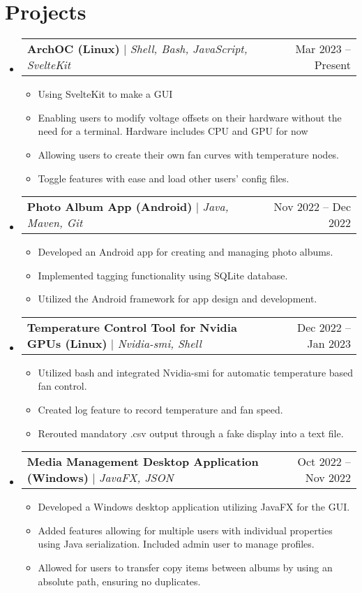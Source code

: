 \documentclass[letterpaper,12pt]{article}
\makeatletter
\newcommand{\resumeItem}[1]{
  \item\small{
    {#1 \vspace{-2pt}}
  }
}
\newcommand{\resumeProjectHeading}[2]{
    \item
    \begin{tabular*}{0.97\textwidth}{l@{\extracolsep{\fill}}r}
      \small#1 & #2 \\
    \end{tabular*}\vspace{-7pt}
}
\newcommand{\resumeSubHeadingListStart}{\begin{itemize}[leftmargin=0.15in, label={}]}
\newcommand{\resumeSubHeadingListEnd}{\end{itemize}}
\newcommand{\resumeItemListStart}{\begin{itemize}}
\newcommand{\resumeItemListEnd}{\end{itemize}\vspace{-5pt}}
\makeatother
\begin{document}
\section{Projects}
    \resumeSubHeadingListStart
      \resumeProjectHeading
          {\textbf{ArchOC (Linux)} $|$ \emph{Shell, Bash, JavaScript, SvelteKit}}{Mar 2023 -- Present}
          \resumeItemListStart
            \resumeItem{Using SvelteKit to make a GUI}
            \resumeItem{Enabling users to modify voltage offsets on their hardware without the need for a terminal. Hardware includes CPU and GPU for now}
            \resumeItem{Allowing users to create their own fan curves with temperature nodes.}
            \resumeItem{Toggle features with ease and load other users’ config files.}
          \resumeItemListEnd
      \resumeProjectHeading
          {\textbf{Photo Album App (Android)} $|$ \emph{Java, Maven, Git}}{Nov 2022 -- Dec 2022}
          \resumeItemListStart
            \resumeItem{Developed an Android app for creating and managing photo albums.}
            \resumeItem{Implemented tagging functionality using SQLite database.}
            \resumeItem{Utilized the Android framework for app design and development.}
          \resumeItemListEnd
     \resumeProjectHeading
          {\textbf{Temperature Control Tool for Nvidia GPUs (Linux)} $|$ \emph{Nvidia-smi, Shell}}{Dec 2022 -- Jan 2023}
          \resumeItemListStart
            \resumeItem{Utilized bash and integrated Nvidia-smi for automatic temperature based fan control.}
            \resumeItem{Created log feature to record temperature and fan speed.}
            \resumeItem{Rerouted mandatory .csv output through a fake display into a text file.}
          \resumeItemListEnd
    \resumeProjectHeading
          {\textbf{Media Management Desktop Application (Windows)} $|$ \emph{JavaFX, JSON}}{Oct 2022 -- Nov 2022}
          \resumeItemListStart
            \resumeItem{Developed a Windows desktop application utilizing JavaFX for the GUI.}
            \resumeItem{Added features allowing for multiple users with individual properties using Java serialization. Included admin user to manage profiles.}
            \resumeItem{Allowed for users to transfer copy items between albums by using an absolute path, ensuring no duplicates.}
          \resumeItemListEnd
    \resumeSubHeadingListEnd



%
\end{document}
